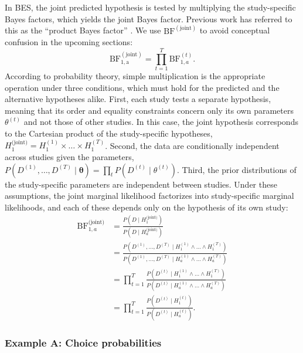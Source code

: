 \documentclass[letterpaper,11pt,oneside]{article}
\begin{document}
In BES, the joint predicted hypothesis is tested by multiplying the study-specific Bayes factors, which yields the joint Bayes factor. Previous work has referred to this as the ``product Bayes factor'' \parencite[PBF;][]{vanlissaTutorialAggregatingEvidence2024, klaassenAllOneAll2018}. We use $\mathrm{BF^{(joint)}}$ to avoid conceptual confusion in the upcoming sections:
\begin{equation}
        \mathrm{BF_{1,a}^{(joint)}} = \prod_{t=1}^{T} \mathrm{BF}_{1,a}^{(t)}.
\end{equation}
According to probability theory, simple multiplication is the appropriate operation under three conditions, which must hold for the predicted and the alternative hypotheses alike. First, each study tests a separate hypothesis, meaning that its order and equality constraints concern only its own parameters
$\theta^{(t)}$ and not those of other studies. In this case, the joint hypothesis corresponds to the Cartesian product of the study-specific hypotheses, $H_1^{\text{(joint)}} = H_1^{(1)} \times \dots \times H_1^{(T)}$. Second, the data are conditionally independent across studies given the parameters,
\mbox{$P(D^{(1)}, \ldots, D^{(T)} \mid \boldsymbol{\theta}) = \prod_{t} P(D^{(t)} \mid \theta^{(t)})$}. Third, the prior distributions of the study-specific parameters are independent between studies. Under these assumptions, the joint marginal likelihood factorizes into study-specific marginal likelihoods, and each of these depends only on the hypothesis of its own study:
    \begin{align}
        \mathrm{BF}_{1,a}^{\text{(joint)}}
        &= \frac{P(D \mid H_1^{\text{(joint)}})}{P(D \mid H_a^{\text{(joint)}})}
        \nonumber \\
        &= \frac
          {P(D^{(1)}, \dots, D^{(T)} \mid H_1^{(1)} \land \dots \land H_1^{(T)})}
          {P(D^{(1)}, \dots, D^{(T)} \mid H_a^{(1)} \land \dots \land H_a^{(T)})}
        \nonumber \\
        &= \prod_{t=1}^{T}
          \frac{P(D^{(t)} \mid H_1^{(1)} \land \dots \land H_1^{(T)})}
               {P(D^{(t)} \mid H_a^{(1)} \land \dots \land H_a^{(T)})}
        \nonumber \\
        &= \prod_{t=1}^{T} \frac{P(D^{(t)} \mid H_1^{(t)})}{P(D^{(t)} \mid H_a^{(t)})}
        \label{eq:bf_1a_joint}.
    \end{align}

\subsubsection{Example A: Choice probabilities}
\end{document}
